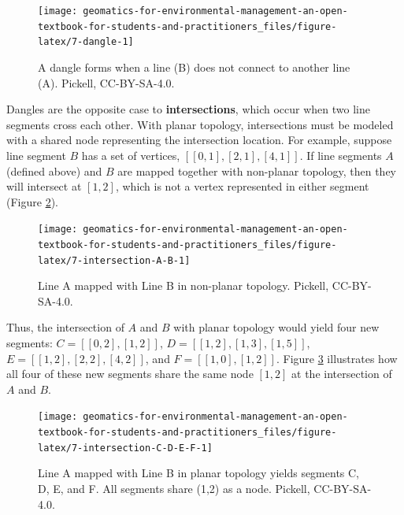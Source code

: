 \documentclass[
]{book}
\begin{document}
\begin{figure}

{\centering \texttt{[image: geomatics-for-environmental-management-an-open-textbook-for-students-and-practitioners\_files/figure-latex/7-dangle-1]} 

}

\caption{A dangle forms when a line (B) does not connect to another line (A). Pickell, CC-BY-SA-4.0.}\label{fig:7-dangle}
\end{figure}

Dangles are the opposite case to \textbf{intersections}, which occur when two line segments cross each other. With planar topology, intersections must be modeled with a shared node representing the intersection location. For example, suppose line segment \(B\) has a set of vertices, \([[0,1],[2,1],[4,1]]\). If line segments \(A\) (defined above) and \(B\) are mapped together with non-planar topology, then they will intersect at \([1,2]\), which is not a vertex represented in either segment (Figure \ref{fig:7-intersection-A-B}).

\begin{figure}

{\centering \texttt{[image: geomatics-for-environmental-management-an-open-textbook-for-students-and-practitioners\_files/figure-latex/7-intersection-A-B-1]} 

}

\caption{Line A mapped with Line B in non-planar topology. Pickell, CC-BY-SA-4.0.}\label{fig:7-intersection-A-B}
\end{figure}

Thus, the intersection of \(A\) and \(B\) with planar topology would yield four new segments: \(C=[[0,2],[1,2]]\), \(D=[[1,2],[1,3],[1,5]]\), \(E=[[1,2],[2,2],[4,2]]\), and \(F=[[1,0],[1,2]]\). Figure \ref{fig:7-intersection-C-D-E-F} illustrates how all four of these new segments share the same node \([1,2]\) at the intersection of \(A\) and \(B\).

\begin{figure}

{\centering \texttt{[image: geomatics-for-environmental-management-an-open-textbook-for-students-and-practitioners\_files/figure-latex/7-intersection-C-D-E-F-1]} 

}

\caption{Line A mapped with Line B in planar topology yields segments C, D, E, and F. All segments share (1,2) as a node. Pickell, CC-BY-SA-4.0.}\label{fig:7-intersection-C-D-E-F}
\end{figure}
\end{document}
